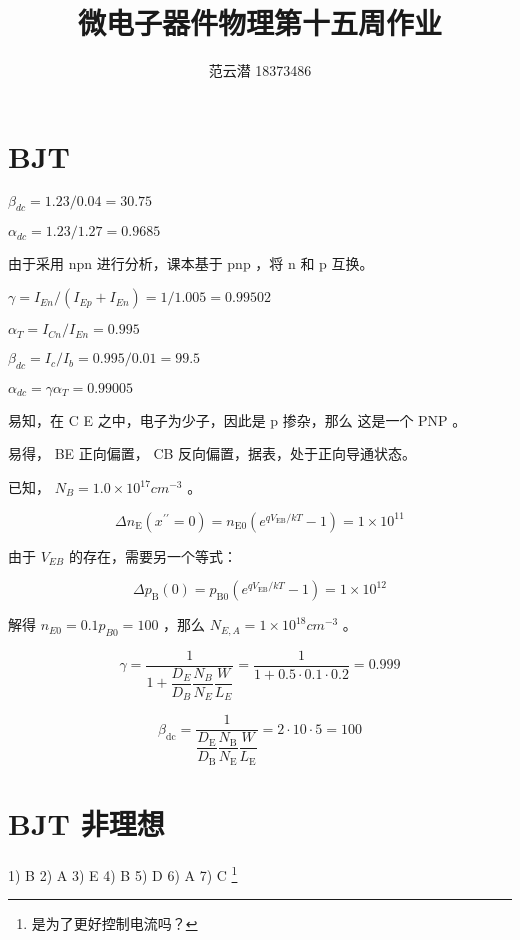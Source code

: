 \documentclass[lang=cn,11pt,a4paper,cite=authoryear,twocolumn]{elegantpaper}
\title{微电子器件物理\quad 第十五周作业}
\author{范云潜 18373486}
\institute{微电子学院 184111 班}
\date{\zhtoday}
\begin{document}
\maketitle

\section{BJT}


\(\beta_{dc} = 1.23 / 0.04 = 30.75\) 

\(\alpha_{dc} = 1.23 / 1.27 = 0.9685\)


由于采用 npn 进行分析，课本基于 pnp ，将 n 和 p 互换。

\(\gamma = I_{En} / (I_{Ep} + I_{En}) = 1/1.005 = 0.99502\)

\(\alpha_T = I_{Cn}/I_{En} = 0.995\)

\(\beta_{dc} = I_c / I_b = 0.995 / 0.01 = 99.5\)

\(\alpha_{dc} = \gamma \alpha_T = 0.99005\)



易知，在 C E 之中，电子为少子，因此是 p 掺杂，那么 这是一个 PNP 。


易得， BE 正向偏置， CB 反向偏置，据表，处于正向导通状态。


已知， \(N_B = 1.0 \times 10^{17} cm^{-3}\) 。

\[
\Delta n_{\mathrm{E}}\left(x^{\prime \prime}=0\right)=n_{\mathrm{E} 0}\left(e^{q V_{\mathrm{EB}} / k T}-1\right) = 1 \times 10^{11}
\]

由于 \(V_{EB}\) 的存在，需要另一个等式：

\[
\Delta p_{\mathrm{B}}(0)=p_{\mathrm{B} 0}\left(e^{q V_{\mathrm{EB}} / k T}-1\right) = 1 \times 10^{12}
\]

解得 \(n_{E0} = 0.1 p_{B0} = 100 \) ，那么 \(N_{E,A} = 1 \times 10^{18} cm^{-3}\) 。


\[
\gamma=\dfrac{1}{1+\dfrac{D_{E}}{D_{B}} \dfrac{N_{B}}{N_{E}} \dfrac{W}{L_{E}}} = \dfrac{1}{1 + 0.5 \cdot 0.1 \cdot 0.2} = 0.999
\]


\[
\beta_{\mathrm{dc}}=\dfrac{1}{\dfrac{D_{\mathrm{E}}}{D_{\mathrm{B}}} \dfrac{N_{\mathrm{B}}}{N_{\mathrm{E}}} \dfrac{W}{L_{\mathrm{E}}}} = 2 \cdot 10 \cdot 5 = 100
\]

\section{BJT 非理想}

1) B 2) A 3) E 4) B 5) D 6) A 7) C \footnote{是为了更好控制电流吗？}


\end{document}
